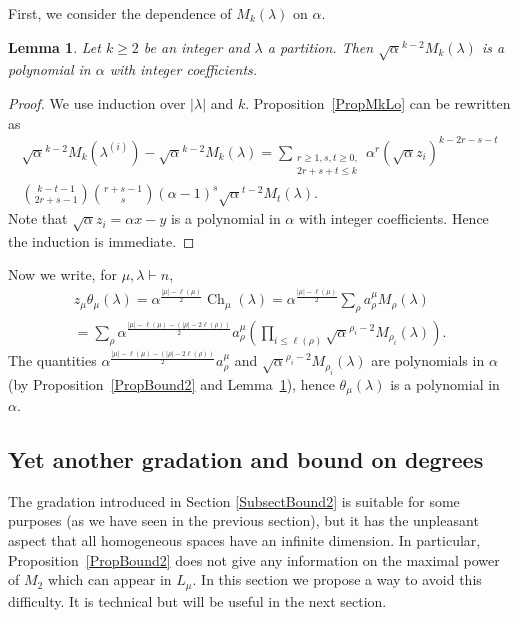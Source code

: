 \documentclass[11pt]{amsart}
\theoremstyle{plain}
\newtheorem{lemma}{Lemma}[section]
\theoremstyle{remark}
\DeclareMathOperator{\Ch}{Ch}
\begin{document}
First, we consider the dependence of $M_k(\lambda)$ on $\alpha$.
\begin{lemma}
    Let $k \geq 2$ be an integer and $\lambda$ a partition.
    Then $\sqrt{\alpha}^{k-2} M_k(\lambda)$ is a polynomial in
    $\alpha$ with integer coefficients.
    \label{LemMkPol}
\end{lemma}
\begin{proof}
    We use induction over $|\lambda|$ and $k$.
    Proposition~\ref{PropMkLo} can be rewritten as
    \begin{multline*} \sqrt{\alpha}^{k-2} M_k(\lambda^{(i)})
        -\sqrt{\alpha}^{k-2} M_k(\lambda) =
        \sum_{\substack{r\geq 1, s,t \geq 0, \\ 2r+s+t \leq k}}
        \alpha^r (\sqrt{\alpha} z_i)^{k-2r-s-t} \\
    \binom{k-t-1}{2r+s-1}\binom{r+s-1}{s}
    \left( \alpha-1 \right)^s \sqrt{\alpha}^{t-2} M_t(\lambda).
\end{multline*}
Note that $\sqrt{\alpha} z_i = \alpha x - y$ is a polynomial
in $\alpha$ with integer coefficients.
Hence the induction is immediate.
\end{proof}
Now we write, for $\mu,\lambda \vdash n$,
\begin{multline*}
    z_\mu \theta_\mu(\lambda)=\alpha^{\frac{|\mu|-\ell(\mu)}{2}} \Ch_\mu(\lambda)
= \alpha^{\frac{|\mu|-\ell(\mu)}{2}} \sum_\rho a^\mu_\rho M_\rho(\lambda) \\
= \sum_\rho \alpha^{\frac{|\mu|-\ell(\mu)-(|\rho|-2\ell(\rho))}{2}} 
a^\mu_\rho \left( \prod_{i \leq \ell(\rho)} \sqrt{\alpha}^{\rho_i-2}
M_{\rho_i}(\lambda) \right).
\end{multline*}
The quantities $\alpha^{\frac{|\mu|-\ell(\mu)-(|\rho|-2\ell(\rho))}{2}} 
a^\mu_\rho$ and $\sqrt{\alpha}^{\rho_i-2}
M_{\rho_i}(\lambda)$ are polynomials in $\alpha$ (by Proposition~\ref{PropBound2}
and Lemma~\ref{LemMkPol}), hence $\theta_\mu(\lambda)$ is a polynomial
in $\alpha$. \qedhere


\subsection{Yet another gradation and bound on degrees}
The gradation introduced in Section \ref{SubsectBound2} is suitable for some
purposes (as we have seen in the previous section), but it has the unpleasant
aspect that all homogeneous spaces have an infinite dimension.
In particular, Proposition~\ref{PropBound2} does not give any information on the
maximal power of $M_2$ which can appear in $L_\mu$.
In this section we propose a way to avoid this difficulty.
It is technical but will be useful in the next section.
\end{document}
